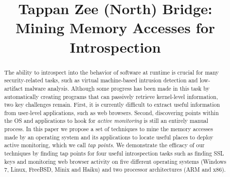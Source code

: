 \documentclass{sig-alternate}
\begin{document}
\date{}

\title{Tappan Zee (North) Bridge: Mining Memory Accesses for Introspection}

%

\maketitle


\begin{abstract}

The ability to introspect into the behavior of software at runtime is
crucial for many security-related tasks, such as virtual machine-based
intrusion detection and low-artifact malware analysis. Although some
progress has been made in this task by automatically creating programs
that can passively retrieve kernel-level information, two key challenges
remain. First, it is currently difficult to extract useful information
from user-level applications, such as web browsers. Second, discovering
points within the OS and applications to hook for \emph{active
monitoring} is still an entirely manual process. In this paper we
propose a set of techniques to mine the memory accesses made by an
operating system and its applications to locate useful places to deploy
active monitoring, which we call \emph{tap points}. We demonstrate the
efficacy of our techniques by finding tap points for four useful
introspection tasks such as finding SSL keys and monitoring web browser
activity on five different operating systems (Windows 7, Linux, FreeBSD,
Minix and Haiku) and two processor architectures (ARM and x86).

\end{abstract}























\end{document}
